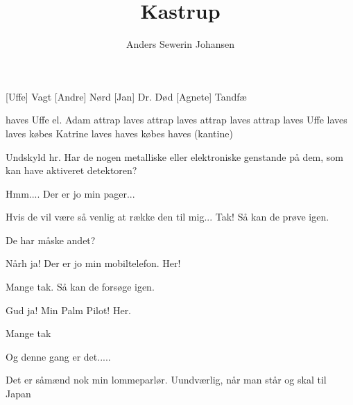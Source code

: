 \documentclass[a4paper,12pt]{article}
\title{Kastrup}
\author{Anders Sewerin Johansen}
\begin{document}
\maketitle

\begin{sketch}

\begin{roles}
  [Uffe] Vagt 
  [Andre] Nørd
  [Jan] Dr. Død
  [Agnete] Tandfæ
\end{roles}

\begin{props}
   haves
   Uffe el. Adam
   attrap laves
   attrap laves
   attrap laves
   attrap laves
   Uffe
   laves
   laves
   købes
   Katrine
   laves
   haves
   købes
   haves (kantine)
\end{props}



 Undskyld hr. Har de nogen metalliske eller elektroniske
genstande på dem, som kan have aktiveret detektoren?

 Hmm.... Der er jo min pager...

 Hvis de vil være så venlig at række den til mig... Tak! Så
kan de prøve igen.


 De har måske andet?

 Nårh ja! Der er jo min mobiltelefon. Her!

 Mange tak. Så kan de forsøge igen.


 Gud ja! Min Palm Pilot! Her.

 Mange tak 


 Og denne gang er det.....

 Det er såmænd nok min lommeparlør. Uundværlig, når man står
og skal til Japan


\end{sketch}
\end{document}
